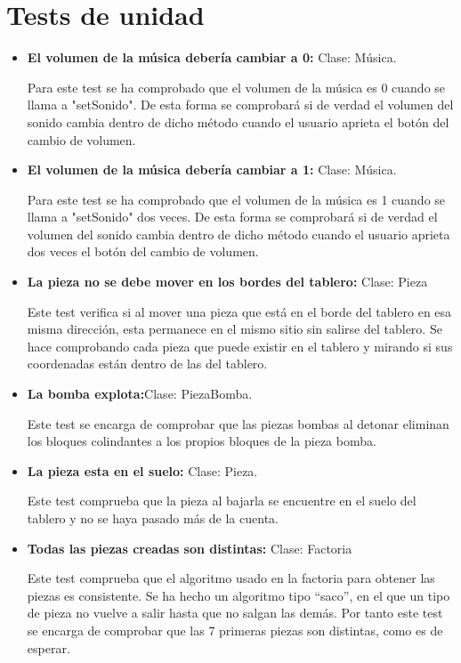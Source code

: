 \documentclass{article}
\begin{document}
\section{Tests de unidad}
\begin{itemize}
\item \textbf{El volumen de la música debería cambiar a 0:} Clase: Música.

Para este test se ha comprobado que el volumen de la música es 0 cuando se llama a "setSonido".
De esta forma se comprobará si de verdad el volumen del sonido cambia dentro de dicho método cuando el usuario aprieta el botón del cambio de volumen.

\item \textbf{El volumen de la música debería cambiar a 1:} Clase: Música.

Para este test se ha comprobado que el volumen de la música es 1 cuando se llama a "setSonido" dos veces.
De esta forma se comprobará si de verdad el volumen del sonido cambia dentro de dicho método cuando el usuario aprieta dos veces el botón del cambio de volumen.

\item \textbf{La pieza no se debe mover en los bordes del tablero:} Clase: Pieza

Este test verifica si al mover una pieza que está en el borde del tablero en esa misma dirección, esta permanece en el mismo sitio sin salirse del tablero. Se hace
comprobando cada pieza que puede existir en el tablero y mirando si sus coordenadas están dentro de las del tablero.

\item \textbf{La bomba explota:}Clase: PiezaBomba.

Este test se encarga de comprobar que las piezas bombas al detonar eliminan los bloques colindantes a los propios bloques de la pieza bomba.
\item \textbf{La pieza esta en el suelo:} Clase: Pieza.

Este test comprueba que la pieza al bajarla se encuentre en el suelo del tablero y no se haya pasado más de la cuenta.
\item \textbf{Todas las piezas creadas son distintas:} Clase: Factoria

Este test comprueba que el algoritmo usado en la factoria para obtener las piezas es consistente. Se ha hecho un algoritmo tipo ``saco'', en el que un tipo de pieza no vuelve a salir hasta que no salgan las demás. Por tanto este test se encarga de comprobar que las 7 primeras piezas son distintas, como es de esperar.


\end{itemize}
\end{document}
